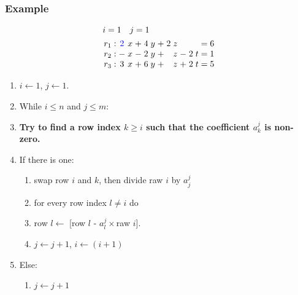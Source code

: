 \documentclass{beamer}
\begin{document}
\begin{frame}
  \frametitle{Example}
  
  \[\arraycolsep=1.4pt
  \begin{aligned}
    &i = 1 \quad j = 1 \\
      &
    \begin{array}{lcccccccccccccc}
      r_1 & : & {\color{blue}2} & x & + & 4 & y & + & 2 & z &  & & & = & 6\\
        r_2 & : & - & x & - & 2 & y & + & & z & - & 2 & t & = & 1\\
        r_3 & : & 3 & x & + & 6 & y & + & & z & + & 2 & t & = & 5\\
    \end{array}
    \end{aligned}
  \]
  
  
  \begin{enumerate}
  \item $i \leftarrow 1$, $j \leftarrow 1$.
  \item While $i \le n$ and $j \le m$:
  \item {\bf Try to find a row index $k \ge i$ such that the coefficient $a^j_k$ is non-zero.}
  \item If there is one:
    \begin{enumerate}
    \item swap row $i$ and $k$, then divide raw $i$ by $a^{j}_j$
    \item for every row index $l \neq i$ do 
    \item row $l \leftarrow$ [row $l$ - $a^j_l\times$raw $i$].
    \item $j \leftarrow j+1$, $i \leftarrow (i+1)$
    \end{enumerate}
  \item Else:
    \begin{enumerate}
    \item $j \leftarrow j+1$
    \end{enumerate}
  \end{enumerate}
  
\end{frame}
\end{document}
